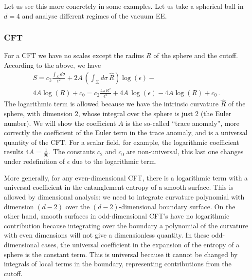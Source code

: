 \documentclass[11pt]{article}
\numberwithin{equation}{section}
\begin{document}
Let us see this more concretely in some examples. Let us take a spherical ball in $d=4$ and analyse different regimes of the vacuum EE.

\subsubsection*{CFT}

For a CFT we have no scales except the radius $R$ of the sphere and the cutoff.
According to the above, we have
\begin{multline}
S=c_2 \frac{\int_\Sigma d\sigma}{\epsilon^2}+ 2 A\, \left(\int_\Sigma d\sigma\, \hat{R}\right) \log(\epsilon) - \\
4 A\log(R) +c_0=c_2 \frac{4 \pi R^2}{\epsilon^2}+ 4 A \, \log(\epsilon) - 4 A\log(R) +c_0\,.
\end{multline}
The logarithmic term is allowed because we have the intrinsic curvature $\hat{R}$ of the sphere, with dimension $2$, whose integral over the sphere is just $2$ (the Euler number). We will show the coefficient $A$ is the so-called ``trace anomaly'', more correctly the coefficient of the Euler term in the trace anomaly, and is a universal quantity of the CFT.  For a scalar field, for example, the logarithmic coefficient results $4A=\frac{1}{90}$. The constants $c_2$ and $c_0$ are non-universal, this last one changes under redefinition of $\epsilon$ due to the logarithmic term.  

More generally, for any even-dimensional CFT, there is a logarithmic term with a universal coefficient in the entanglement entropy of a smooth surface. This is allowed by dimensional analysis: we need to integrate curvature polynomial with dimension $(d-2)$ over the $(d-2)$-dimensional boundary surface.  On the other hand, smooth surfaces in odd-dimensional CFT's have no logarithmic contribution because integrating over the boundary a polynomial of the curvature with even dimensions will not give a dimensionless quantity. In these odd-dimensional cases, the universal coefficient in the expansion of the entropy of a sphere is the constant term. This is universal because it cannot be changed by integrals of local terms in the boundary, representing contributions from the cutoff. 
\end{document}

